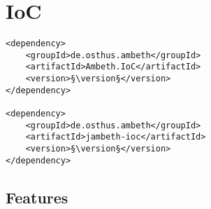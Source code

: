 \section{IoC}
\label{module:IoC}
\ClearAPI
\TODO

\begin{lstlisting}[style=POM,caption={Maven modules to use \emph{Ambeth IoC}}]
<dependency>
	<groupId>de.osthus.ambeth</groupId>
	<artifactId>Ambeth.IoC</artifactId>
	<version>§\version§</version>
</dependency>

<dependency>
	<groupId>de.osthus.ambeth</groupId>
	<artifactId>jambeth-ioc</artifactId>
	<version>§\version§</version>
</dependency>
\end{lstlisting}
\subsection{Features}
